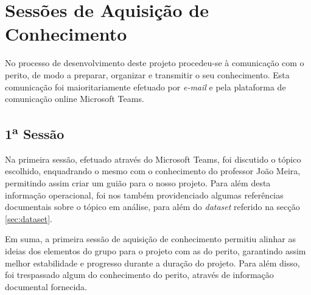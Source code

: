 
\section{Sessões de Aquisição de Conhecimento}

No processo de desenvolvimento deste projeto procedeu-se à comunicação com o perito, de modo a preparar, organizar e transmitir o seu conhecimento. Esta comunicação foi maioritariamente efetuado por \textit{e-mail} e pela plataforma de comunicação online Microsoft Teams.

\subsection{1\textsuperscript{a} Sessão}

Na primeira sessão, efetuado através do Microsoft Teams, foi discutido o tópico escolhido, enquadrando o mesmo com o conhecimento do professor João Meira, permitindo assim criar um guião para o nosso projeto. Para além desta informação operacional, foi nos também providenciado algumas referências documentais sobre o tópico em análise, para além do \textit{dataset} referido na secção \ref{sec:dataset}.

Em suma, a primeira sessão de aquisição de conhecimento permitiu alinhar as ideias dos elementos do grupo para o projeto com as do perito, garantindo assim melhor estabilidade e progresso durante a duração do projeto. Para além disso, foi trespassado algum do conhecimento do perito, através de informação documental fornecida.